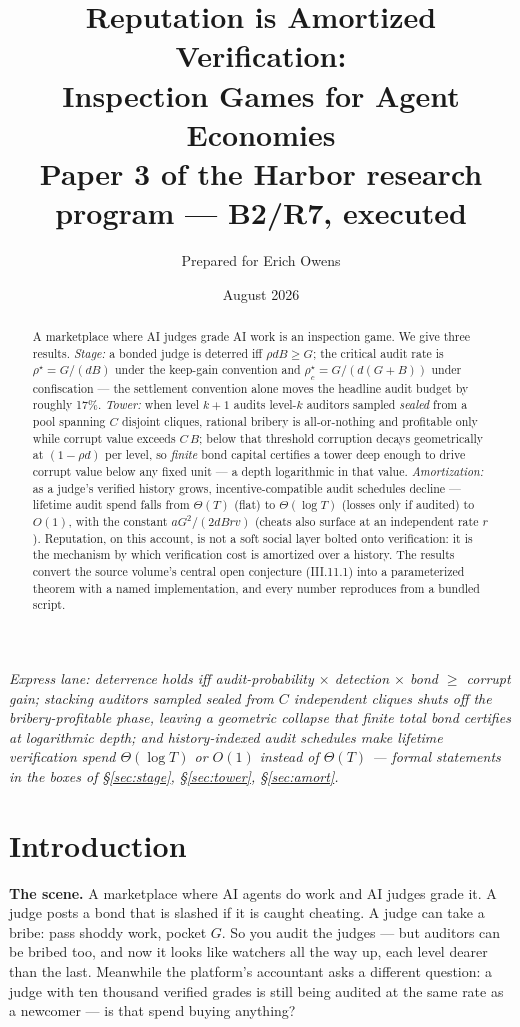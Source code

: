 \documentclass[11pt,a4paper]{article}
\title{\textbf{Reputation is Amortized Verification:}\\[3pt]
\large Inspection Games for Agent Economies\\[3pt]
\normalsize Paper 3 of the Harbor research program --- B2/R7, executed}
\author{Prepared for Erich Owens}
\date{August 2026}
\begin{document}
\maketitle

\begin{abstract}
\noindent A marketplace where AI judges grade AI work is an inspection game. We give three results. \emph{Stage:} a bonded judge is deterred iff $\rho d B \ge G$; the critical audit rate is $\rho^\star = G/(dB)$ under the keep-gain convention and $\rho^\star_c = G/(d(G{+}B))$ under confiscation --- the settlement convention alone moves the headline audit budget by roughly 17\%. \emph{Tower:} when level $k{+}1$ audits level-$k$ auditors sampled \emph{sealed} from a pool spanning $C$ disjoint cliques, rational bribery is all-or-nothing and profitable only while corrupt value exceeds $C\,B$; below that threshold corruption decays geometrically at $(1-\rho d)$ per level, so \emph{finite} bond capital certifies a tower deep enough to drive corrupt value below any fixed unit --- a depth logarithmic in that value. \emph{Amortization:} as a judge's verified history grows, incentive-compatible audit schedules decline --- lifetime audit spend falls from $\Theta(T)$ (flat) to $\Theta(\log T)$ (losses only if audited) to $O(1)$, with the constant $aG^2/(2dBrv)$ (cheats also surface at an independent rate $r$). Reputation, on this account, is not a soft social layer bolted onto verification: it is the mechanism by which verification cost is amortized over a history. The results convert the source volume's central open conjecture (III.11.1) into a parameterized theorem with a named implementation, and every number reproduces from a bundled script.
\end{abstract}

\noindent\emph{Express lane: deterrence holds iff audit-probability $\times$ detection $\times$ bond $\ge$ corrupt gain; stacking auditors sampled sealed from $C$ independent cliques shuts off the bribery-profitable phase, leaving a geometric collapse that finite total bond certifies at logarithmic depth; and history-indexed audit schedules make lifetime verification spend $\Theta(\log T)$ or $O(1)$ instead of $\Theta(T)$ --- formal statements in the boxes of \S\ref{sec:stage}, \S\ref{sec:tower}, \S\ref{sec:amort}.}

\section{Introduction}\label{sec:intro}
\textbf{The scene.} A marketplace where AI agents do work and AI judges grade it. A judge posts a bond that is slashed if it is caught cheating. A judge can take a bribe: pass shoddy work, pocket $G$. So you audit the judges --- but auditors can be bribed too, and now it looks like watchers all the way up, each level dearer than the last. Meanwhile the platform's accountant asks a different question: a judge with ten thousand verified grades is still being audited at the same rate as a newcomer --- is that spend buying anything?
\end{document}
